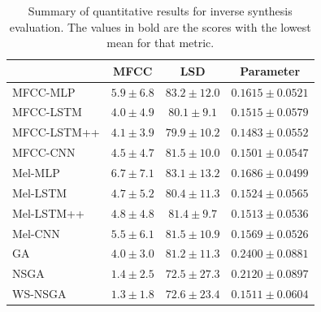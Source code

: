 \begin{table}[ht]
\centering
\begin{tabular}{l|ccc}
\toprule
{} & MFCC & LSD & Parameter \\
\midrule
MFCC-MLP    &       $5.9 \pm      6.8$ &     $83.2 \pm    12.0$ &     $0.1615 \pm    0.0521$ \\
MFCC-LSTM   &       $4.0 \pm      4.9$ &     $80.1 \pm     9.1$ &     $0.1515 \pm    0.0579$ \\
MFCC-LSTM++ &       $4.1 \pm      3.9$ &     $79.9 \pm    10.2$ &     $\mathbf{0.1483 \pm    0.0552}$ \\
MFCC-CNN    &       $4.5 \pm      4.7$ &     $81.5 \pm    10.0$ &     $0.1501 \pm    0.0547$ \\
\midrule
Mel-MLP     &       $6.7 \pm      7.1$ &     $83.1 \pm    13.2$ &     $0.1686 \pm    0.0499$ \\
Mel-LSTM    &       $4.7 \pm      5.2$ &     $80.4 \pm    11.3$ &     $0.1524 \pm    0.0565$ \\
Mel-LSTM++  &       $4.8 \pm      4.8$ &     $81.4 \pm     9.7$ &     $0.1513 \pm    0.0536$ \\
Mel-CNN    &       $5.5 \pm      6.1$ &     $81.5 \pm    10.9$ &     $0.1569 \pm    0.0526$ \\
\midrule
GA          &       $4.0 \pm      3.0$ &     $81.2 \pm    11.3$ &     $0.2400 \pm    0.0881$ \\
NSGA        &       $1.4 \pm      2.5$ &     $\mathbf{72.5 \pm    27.3}$ &     $0.2120 \pm    0.0897$ \\
WS-NSGA     &       $\mathbf{1.3 \pm      1.8}$ &     $72.6 \pm    23.4$ &     $0.1511 \pm    0.0604$ \\
\bottomrule
\end{tabular}
\caption{Summary of quantitative results for inverse synthesis evaluation. The values in bold are the scores with the lowest mean for that metric.}
\label{tbl:objective_resuls}
\end{table}


